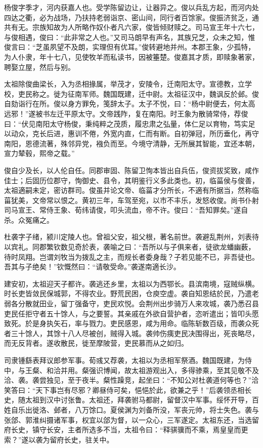 \documentclass[12pt,UTF8]{ctexbook}
\begin{document}
杨俊字季才，河内获嘉人也。受学陈留边让，让器异之。俊以兵乱方起，而河内处四达之衢，必为战场，乃扶持老弱诣京、密山间，同行者百馀家。俊振济贫乏，通共有无。宗族知故为人所略作奴仆者凡六家，俊皆倾财赎之。司马宣王年十六七，与俊相遇，俊曰：“此非常之人也。”又司马朗早有声名，其族兄芝，众未之知，惟俊言曰：“芝虽夙望不及朗，实理但有优耳。”俊转避地并州。本郡王象，少孤特，为人仆隶，年十七八，见使牧羊而私读书，因被箠楚。俊嘉其才质，即赎象著家，聘娶立屋，然后与别。

太祖除俊曲梁长，入为丞相掾属，举茂才，安陵令，迁南阳太守。宣德教，立学校，吏民称之。徙为征南军师。魏国既建，迁中尉。太祖征汉中，魏讽反於邺。俊自劾诣行在所。俊以身方罪免，笺辞太子。太子不悦，曰：“杨中尉便去，何太高远邪！”遂被书左迁平原太守。文帝践阼，复在南阳。时王象为散骑常侍，荐俊曰：“伏见南阳太守杨俊，秉纯粹之茂质，履忠肃之弘量，体仁足以育物，笃实足以动众，克长后进，惠训不倦，外宽内直，仁而有断。自初弹冠，所历垂化，再守南阳，恩德流著，殊邻异党，襁负而至。今境守清静，无所展其智能，宜还本朝，宣力辇毂，熙帝之载。”

俊自少及长，以人伦自任。同郡审固、陈留卫恂本皆出自兵伍，俊资拔奖致，咸作佳士；后固历位郡守，恂御史、县令，其明鉴行义多此类也。初，临菑侯与俊善，太祖適嗣未定，密访群司。俊虽并论文帝、临菑才分所长，不適有所据当，然称临菑犹美，文帝常以恨之。黄初三年，车驾至宛，以巿不丰乐，发怒收俊。尚书仆射司马宣王、常侍王象、荀纬请俊，叩头流血，帝不许。俊曰：“吾知罪矣。”遂自杀。众冤痛之。

杜袭字子绪，颍川定陵人也。曾祖父安，祖父根，著名前世。袭避乱荆州，刘表待以宾礼。同郡繁钦数见奇於表，袭喻之曰：“吾所以与子俱来者，徒欲龙蟠幽薮，待时凤翔。岂谓刘牧当为拨乱之主，而规长者委身哉？子若见能不已，非吾徒也。吾其与子绝矣！”钦慨然曰：“请敬受命。”袭遂南適长沙。

建安初，太祖迎天子都许。袭逃还乡里，太祖以为西鄂长。县滨南境，寇贼纵横。时长吏皆敛民保城郭，不得农业。野荒民困，仓庾空虚。袭自知恩结於民，乃遣老弱各分散就田业，留丁强备守，吏民欢悦。会荆州出步骑万人来攻城，袭乃悉召县吏民任拒守者五十馀人，与之要誓。其亲戚在外欲自营护者，恣听遣出；皆叩头愿致死。於是身执矢石，率与戮力。吏民感恩，咸为用命。临陈斩数百级，而袭众死者三十馀人，其馀十八人尽被创，贼得入城。袭帅伤痍吏民决围得出，死丧略尽，而无反背者。遂收散民，徙至摩陂营，吏民慕而从之如归。

司隶锺繇表拜议郎参军事。荀彧又荐袭，太祖以为丞相军祭酒。魏国既建，为侍中，与王粲、和洽并用。粲强识博闻，故太祖游观出入，多得骖乘，至其见敬不及洽、袭。袭尝独见，至于夜半。粲性躁竞，起坐曰：“不知公对杜袭道何等也？”洽笑答曰：“天下事岂有尽邪？卿昼侍可矣，悒悒於此，欲兼之乎！”后袭领丞相长史，随太祖到汉中讨张鲁。太祖还，拜袭驸马都尉，留督汉中军事。绥怀开导，百姓自乐出徙洛、邺者，八万馀口。夏侯渊为刘备所没，军丧元帅，将士失色。袭与张郃、郭淮纠摄诸军事，权宜以郃为督，以一众心，三军遂定。太祖东还，当选留府长史，镇守长安，主者所选多不当，太祖令曰：“释骐骥而不乘，焉皇皇而更索？”遂以袭为留府长史，驻关中。
\end{document}
